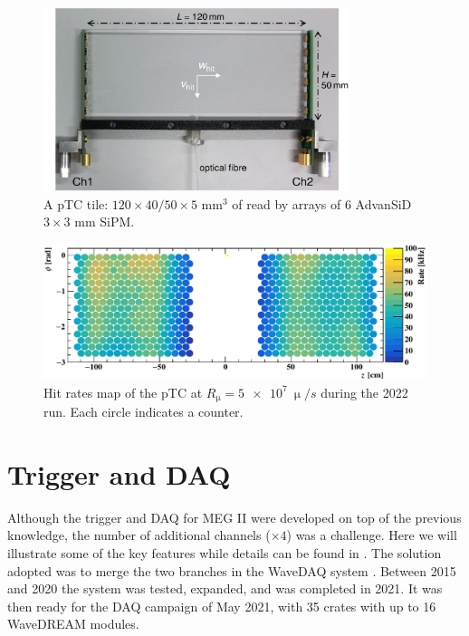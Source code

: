 \begin{refsection}
        \begin{figure}
            \centering
            \includegraphics[width = 0.8\textwidth]{Figures/MEG/pTC_tile.png}
            \caption[pTC: picture of a tile]{A pTC tile: $120\times40/50\times5$ mm$^3$ of  read by arrays of 6 AdvanSiD $3\times3$ mm SiPM.}
            \label{fig:MEGII:pTC:tile}
        \end{figure}

        \begin{figure}
            \centering
            \includegraphics[width = \textwidth]{Figures/MEG/pTC_rate.png}
            \caption[pTC: rates map]{Hit rates map of the pTC at $R_\upmu = \SI{5e7}{\upmu \per s}$ during the 2022 run. Each circle indicates a counter.}
            \label{fig:MEGII:pTC:rate}
        \end{figure}

\section{Trigger and DAQ}
    Although the trigger and DAQ for MEG II were developed on top of the previous knowledge, the number of additional channels ($\times4$) was a challenge. 
    Here we will illustrate some of the key features while details can be found in \cite{Galli2014JINST}.
    The solution adopted was to merge the two branches in the WaveDAQ system \cite{Ritt2010NIMA}.
    Between 2015 and 2020 the system was tested, expanded, and was completed in 2021.
    It was then ready for the DAQ campaign of May 2021, with 35 crates with up to 16 WaveDREAM modules.


\end{refsection}
